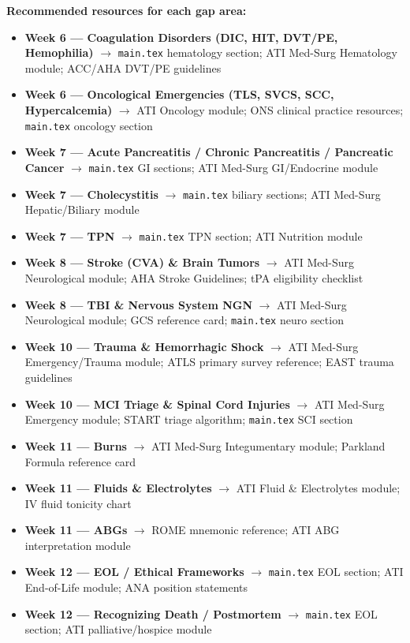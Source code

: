 \documentclass[11pt,letterpaper]{article}
\begin{document}
\begin{planbox}
\vspace{0.4cm}

\textbf{Recommended resources for each gap area:}
\begin{itemize}[leftmargin=2em]
  \item \textbf{Week 6 --- Coagulation Disorders (DIC, HIT, DVT/PE, Hemophilia)} $\rightarrow$
        \texttt{main.tex} hematology section; ATI Med-Surg Hematology module; ACC/AHA DVT/PE guidelines
  \item \textbf{Week 6 --- Oncological Emergencies (TLS, SVCS, SCC, Hypercalcemia)} $\rightarrow$
        ATI Oncology module; ONS clinical practice resources; \texttt{main.tex} oncology section
  \item \textbf{Week 7 --- Acute Pancreatitis / Chronic Pancreatitis / Pancreatic Cancer} $\rightarrow$
        \texttt{main.tex} GI sections; ATI Med-Surg GI/Endocrine module
  \item \textbf{Week 7 --- Cholecystitis} $\rightarrow$
        \texttt{main.tex} biliary sections; ATI Med-Surg Hepatic/Biliary module
  \item \textbf{Week 7 --- TPN} $\rightarrow$
        \texttt{main.tex} TPN section; ATI Nutrition module
  \item \textbf{Week 8 --- Stroke (CVA) \& Brain Tumors} $\rightarrow$
        ATI Med-Surg Neurological module; AHA Stroke Guidelines; tPA eligibility checklist
  \item \textbf{Week 8 --- TBI \& Nervous System NGN} $\rightarrow$
        ATI Med-Surg Neurological module; GCS reference card; \texttt{main.tex} neuro section
  \item \textbf{Week 10 --- Trauma \& Hemorrhagic Shock} $\rightarrow$
        ATI Med-Surg Emergency/Trauma module; ATLS primary survey reference; EAST trauma guidelines
  \item \textbf{Week 10 --- MCI Triage \& Spinal Cord Injuries} $\rightarrow$
        ATI Med-Surg Emergency module; START triage algorithm; \texttt{main.tex} SCI section
  \item \textbf{Week 11 --- Burns} $\rightarrow$
        ATI Med-Surg Integumentary module; Parkland Formula reference card
  \item \textbf{Week 11 --- Fluids \& Electrolytes} $\rightarrow$
        ATI Fluid \& Electrolytes module; IV fluid tonicity chart
  \item \textbf{Week 11 --- ABGs} $\rightarrow$
        ROME mnemonic reference; ATI ABG interpretation module
  \item \textbf{Week 12 --- EOL / Ethical Frameworks} $\rightarrow$
        \texttt{main.tex} EOL section; ATI End-of-Life module; ANA position statements
  \item \textbf{Week 12 --- Recognizing Death / Postmortem} $\rightarrow$
        \texttt{main.tex} EOL section; ATI palliative/hospice module
\end{itemize}


\end{planbox}
\end{document}
